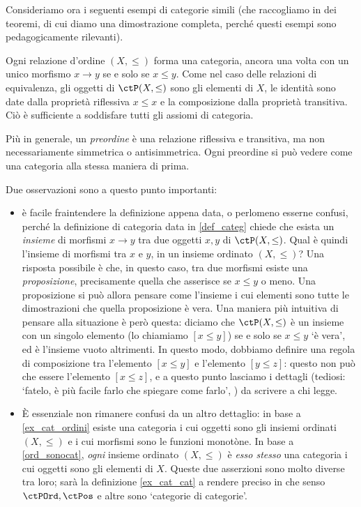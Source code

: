 Consideriamo ora i seguenti esempi di categorie simili (che raccogliamo in dei teoremi, di cui diamo una dimostrazione completa, perché questi esempi sono pedagogicamente rilevanti).
\begin{examples}\label{ord_sonocat}
	Ogni relazione d'ordine \((X,\le)\) forma una categoria, ancora una volta con un unico morfismo \(x\to y\) se e solo se \(x\le y\). Come nel caso delle relazioni di equivalenza, gli oggetti di \(\ctP(X,\le)\) sono gli elementi di \(X\), le identità sono date dalla proprietà riflessiva \(x\le x\) e la composizione dalla proprietà transitiva. Ciò è sufficiente a soddisfare tutti gli assiomi di categoria.

	Più in generale, un \emph{preordine} è una relazione riflessiva e transitiva, ma non necessariamente simmetrica o antisimmetrica. Ogni preordine si può vedere come una categoria alla stessa maniera di prima.
\end{examples}
\begin{remark}\label{ord_sonocat_maenriched}
	Due osservazioni sono a questo punto importanti:
	\begin{itemize}
		\item è facile fraintendere la definizione appena data, o perlomeno esserne confusi, perché la definizione di categoria data in \ref{def_categ} chiede che esista un \emph{insieme} di morfismi \(x\to y\) tra due oggetti \(x,y\) di \(\ctP(X,\le)\). Qual è quindi l'insieme di morfismi tra \(x\) e \(y\), in un insieme ordinato \((X,\le)\)? Una risposta possibile è che, in questo caso, tra due morfismi esiste una \emph{proposizione}, precisamente quella che asserisce se \(x\le y\) o meno. Una proposizione si può allora pensare come l'insieme i cui elementi sono tutte le dimostrazioni che quella proposizione è vera. Una maniera più intuitiva di pensare alla situazione è però questa: diciamo che \(\ctP(X,\le)\) è un insieme con un singolo elemento (lo chiamiamo \([x\le y]\)) se e solo se \(x\le y\) `è vera', ed è l'insieme vuoto altrimenti. In questo modo, dobbiamo definire una regola di composizione tra l'elemento \([x\le y]\) e l'elemento \([y\le z]\): questo non può che essere l'elemento \([x\le z]\), e a questo punto lasciamo i dettagli (tediosi: `fatelo, è più facile farlo che spiegare come farlo', \cite{zee2010quantum}) da scrivere a chi legge.
		\item \`E essenziale non rimanere confusi da un altro dettaglio: in base a \ref{ex_cat_ordini} esiste una categoria i cui oggetti sono gli insiemi ordinati \((X,\le)\) e i cui morfismi sono le funzioni monotòne. In base a \ref{ord_sonocat}, \emph{ogni} insieme ordinato \((X,\le)\) è \emph{esso stesso} una categoria i cui oggetti sono gli elementi di \(X\). Queste due asserzioni sono molto diverse tra loro; sarà la definizione \ref{ex_cat_cat} a rendere preciso in che senso \(\ctPOrd,\ctPos\) e altre sono `categorie di categorie'.
	\end{itemize}
\end{remark}
